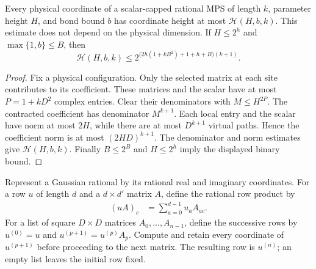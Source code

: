 \begin{lemma}
    \label{lem:lvv_contracted_coordinate_height}
    \leanok
    Every physical coordinate of a scalar-capped rational MPS of length
    $k$, parameter height $H$, and bond bound $b$ has coordinate height
    at most $\mathcal H(H,b,k)$. This estimate does not depend on the
    physical dimension. If $H\le2^h$ and $\max\{1,b\}\le B$, then
    \[
        \mathcal H(H,b,k)
        \le2^{\bigl(2h(1+kB^2)+1+h+B\bigr)(k+1)}.
    \]
\end{lemma}
\begin{proof}\leanok
    Fix a physical configuration. Only the selected matrix at each site
    contributes to its coefficient. These matrices and the scalar have
    at most $P=1+kD^2$ complex entries. Clear their denominators with
    $M\le H^{2P}$. The contracted coefficient has denominator $M^{k+1}$.
    Each local entry and the scalar have norm at most $2H$, while there
    are at most $D^{k+1}$ virtual paths. Hence the coefficient norm is
    at most $(2HD)^{k+1}$. The denominator and norm estimates give
    $\mathcal H(H,b,k)$.
    Finally $B\le2^B$ and $H\le2^h$ imply the displayed binary bound.
\end{proof}

\begin{definition}
    \label{def:lvv_rational_row_contraction}
    \leanok
    Represent a Gaussian rational by its rational real and imaginary
    coordinates. For a row $u$ of length $d$ and a $d\times d'$ matrix
    $A$, define the rational row product by
    \begin{align*}
        (uA)_c & =\sum_{a=0}^{d-1}u_aA_{ac}.
    \end{align*}
    For a list of square $D\times D$ matrices $A_0,\ldots,A_{n-1}$,
    define the successive rows by $u^{(0)}=u$ and
    $u^{(p+1)}=u^{(p)}A_p$. Compute and retain every coordinate of
    $u^{(p+1)}$ before proceeding to the next matrix. The resulting
    row is $u^{(n)}$; an empty list leaves the initial row fixed.
\end{definition}

